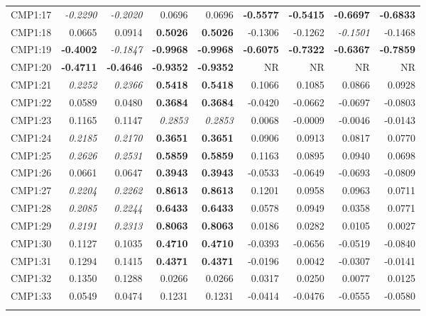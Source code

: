 \documentclass[review]{elsarticle}
\begin{document}
\begin{center}
\begin{longtable}{lrrrrrrrr}
CMP1:17 & \textit{-0.2290} & \textit{-0.2020} & 0.0696 & 0.0696 & \textbf{-0.5577} & \textbf{-0.5415} & \textbf{-0.6697} & \textbf{-0.6833}\\
CMP1:18 & 0.0665 & 0.0914 & \textbf{0.5026} & \textbf{0.5026} & -0.1306 & -0.1262 & \textit{-0.1501} & -0.1468\\
CMP1:19 & \textbf{-0.4002} & \textit{-0.1847} & \textbf{-0.9968} & \textbf{-0.9968} & \textbf{-0.6075} & \textbf{-0.7322} & \textbf{-0.6367} & \textbf{-0.7859} \\
CMP1:20 & \textbf{-0.4711} & \textbf{-0.4646} & \textbf{-0.9352} & \textbf{-0.9352} & NR & NR & NR & NR\\
CMP1:21 & \textit{0.2252} & \textit{0.2366} & \textbf{0.5418} & \textbf{0.5418} & 0.1066 & 0.1085 & 0.0866 & 0.0928\\
CMP1:22 & 0.0589 & 0.0480 & \textbf{0.3684} & \textbf{0.3684} & -0.0420 & -0.0662 & -0.0697 & -0.0803\\
CMP1:23 & 0.1165 & 0.1147 & \textit{0.2853} & \textit{0.2853} & 0.0068 & -0.0009 & -0.0046 & -0.0143\\
CMP1:24 & \textit{0.2185} & \textit{0.2170} & \textbf{0.3651} & \textbf{0.3651} & 0.0906 & 0.0913 & 0.0817 & 0.0770\\
CMP1:25 & \textit{0.2626} & \textit{0.2531} & \textbf{0.5859} & \textbf{0.5859} & 0.1163 & 0.0895 & 0.0940 & 0.0698\\
CMP1:26 & 0.0661 & 0.0647 & \textbf{0.3943} & \textbf{0.3943} & -0.0533 & -0.0649 & -0.0693 & -0.0809\\
CMP1:27 & \textit{0.2204} & \textit{0.2262} & \textbf{0.8613} & \textbf{0.8613} & 0.1201 & 0.0958 & 0.0963 & 0.0711\\
CMP1:28 & \textit{0.2085} & \textit{0.2244} & \textbf{0.6433} & \textbf{0.6433} & 0.0578 & 0.0949 & 0.0358 & 0.0771\\
CMP1:29 & \textit{0.2191} & \textit{0.2313} & \textbf{0.8063} & \textbf{0.8063} & 0.0186 & 0.0282 & 0.0105 & 0.0027\\
CMP1:30 & 0.1127 & 0.1035 & \textbf{0.4710} & \textbf{0.4710} & -0.0393 & -0.0656 & -0.0519 & -0.0840\\
CMP1:31 & 0.1294 & 0.1415 & \textbf{0.4371} & \textbf{0.4371} & -0.0196 & 0.0042 & -0.0307 & -0.0141\\
CMP1:32 & 0.1350 & 0.1288 & 0.0266 & 0.0266 & 0.0317 & 0.0250 & 0.0077 & 0.0125\\
CMP1:33 & 0.0549 & 0.0474 & 0.1231 & 0.1231 & -0.0414 & -0.0476 & -0.0555 & -0.0580\\
\hline\\

\end{longtable}
\end{center}
\end{document}
